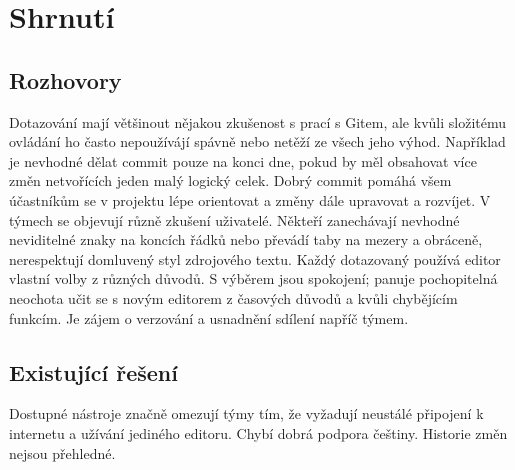 \section{Shrnutí}

\subsection{Rozhovory}

Dotazování mají většinout nějakou zkušenost s prací s Gitem, ale kvůli složitému ovládání ho často nepoužívájí spávně nebo netěží ze všech jeho výhod. Například je nevhodné dělat commit pouze na konci dne, pokud by měl obsahovat více změn netvořících jeden malý logický celek. Dobrý commit pomáhá všem účastníkům se v projektu lépe orientovat a změny dále upravovat a rozvíjet. V týmech se objevují různě zkušení uživatelé. Někteří zanechávají nevhodné neviditelné znaky na koncích řádků nebo převádí taby na mezery a obráceně, nerespektují domluvený styl zdrojového textu. Každý dotazovaný používá editor vlastní volby z různých důvodů. S výběrem jsou spokojení; panuje pochopitelná neochota učit se s novým editorem z časových důvodů a kvůli chybějícím funkcím. Je zájem o verzování a usnadnění sdílení napříč týmem.

\subsection{Existující řešení}

Dostupné nástroje značně omezují týmy tím, že vyžadují neustálé připojení k internetu a užívání jediného editoru. Chybí dobrá podpora češtiny. Historie změn nejsou přehledné.